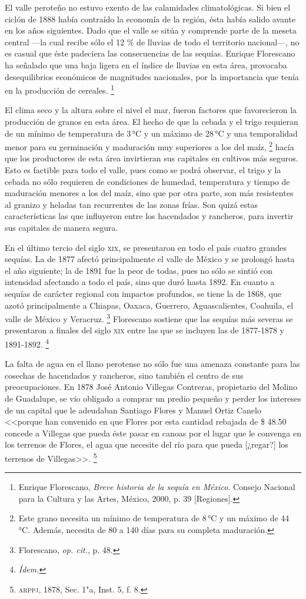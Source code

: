\documentclass[14pt,twoside,final]{extbook} %
\let\oldfootnote\footnote
\renewcommand\footnote[1]{%
\oldfootnote{\hspace{1mm}#1}}
\begin{document}
El valle peroteño no estuvo exento de las calamidades climatológicas. Si bien el ciclón de 1888 había contraído la economía de la región, ésta había salido avante en los años siguientes. Dado que el valle se sitúa y comprende parte de la meseta central ---la cual recibe sólo el 12 \% de lluvias de todo el territorio nacional---, no es casual que éste padeciera las consecuencias de las sequías. Enrique Florescano ha señalado que una baja ligera en el índice de lluvias en esta área, provocaba desequilibrios económicos de magnitudes nacionales, por la importancia que tenía en la producción de cereales.\footnote{Enrique Florescano, \emph{Breve historia de la sequía en México}. Consejo Nacional para la Cultura y las Artes, México, 2000, p. 39 [Regiones].}

El clima seco y la altura sobre el nivel el mar, fueron factores que favorecieron la producción de granos en esta área. El hecho de que la cebada y el trigo requieran de un mínimo de temperatura de 3\,°C y un máximo de 28\,°C y una temporalidad menor para su germinación y maduración muy superiores a los del maíz,\footnote{Este grano necesita un mínimo de temperatura de 8\,°C y un máximo de 44\,°C. Además, necesita de 80 a 140 días para su completa maduración.} hacía que los productores de esta área invirtieran sus capitales en cultivos más seguros. Esto es factible para todo el valle, pues como se podrá observar, el trigo y la cebada no sólo requieren de condiciones de humedad, temperatura y tiempo de maduración menores a los del maíz, sino que por otra parte, son más resistentes al granizo y heladas tan recurrentes de las zonas frías. Son quizá estas características las que influyeron entre los hacendados y rancheros, para invertir sus capitales de manera segura.

En el último tercio del siglo \textsc{xix}, se presentaron en todo el país cuatro grandes sequías. La de 1877 afectó principalmente el valle de México y se prolongó hasta el año siguiente; la de 1891 fue la peor de todas, pues no sólo se sintió con intensidad afectando a todo el país, sino que duró hasta 1892. En cuanto a sequías de carácter regional con impactos profundos, se tiene la de 1868, que azotó principalmente a Chiapas, Oaxaca, Guerrero, Aguascalientes, Coahuila, el valle de México y Veracruz.\footnote{Florescano, \emph{op. cit.}, p. 48.} Florescano sostiene que las sequías más severas se presentaron a finales del siglo \textsc{xix} entre las que se incluyen las de 1877-1878 y 1891-1892.\footnote{\em Ídem.}

La falta de agua en el llano perotense no sólo fue una amenaza constante para las cosechas de hacendados y rancheros, sino también el centro de sus preocupaciones. En 1878 José Antonio Villegas Contreras, propietario del Molino de Guadalupe, se vio obligado a comprar un predio pequeño y perder los intereses de un capital que le adeudaban Santiago Flores y Manuel Ortiz Canelo <<porque han convenido en que Flores por esta cantidad rebajada de \$ 48.50 concede a Villegas que pueda éste pasar en canoas por el lugar que le convenga en los terrenos de Flores, el agua que necesite del río para que pueda [¿regar?] los terrenos de Villegas>>.\footnote{\textsc{arppj}, 1878, Sec. 1"a, Inst. 5, f. 8.}
\end{document}
